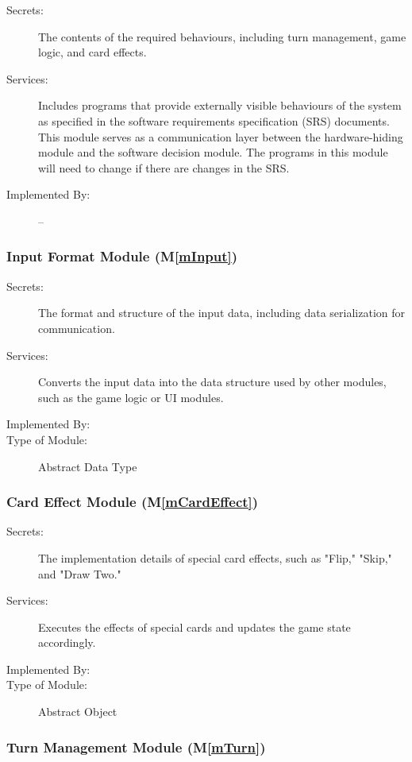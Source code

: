 \documentclass[12pt, titlepage]{article}
\newcommand{\mref}[1]{M\ref{#1}}
\begin{document}
\begin{description}
\item[Secrets:] The contents of the required behaviours, including turn management, game logic, and card effects.
\item[Services:] Includes programs that provide externally visible behaviours of
  the system as specified in the software requirements specification (SRS)
  documents. This module serves as a communication layer between the
  hardware-hiding module and the software decision module. The programs in this
  module will need to change if there are changes in the SRS.
\item[Implemented By:] --
\end{description}

\subsubsection{Input Format Module (\mref{mInput})}

\begin{description}
\item[Secrets:] The format and structure of the input data, including data serialization for communication.
\item[Services:] Converts the input data into the data structure used by other
  modules, such as the game logic or UI modules.
\item[Implemented By:] \progname{}
\item[Type of Module:] Abstract Data Type
\end{description}

\subsubsection{Card Effect Module (\mref{mCardEffect})}

\begin{description}
\item[Secrets:] The implementation details of special card effects, such as "Flip," "Skip," and "Draw Two."
\item[Services:] Executes the effects of special cards and updates the game state accordingly.
\item[Implemented By:] \progname{}
\item[Type of Module:] Abstract Object
\end{description}

\subsubsection{Turn Management Module (\mref{mTurn})}
\end{document}
